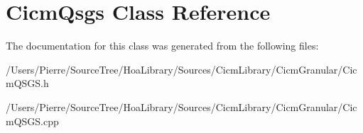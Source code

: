 \hypertarget{class_cicm_qsgs}{\section{Cicm\-Qsgs Class Reference}
\label{class_cicm_qsgs}
}


The documentation for this class was generated from the following files\-:\begin{DoxyCompactItemize}
\item 
/\-Users/\-Pierre/\-Source\-Tree/\-Hoa\-Library/\-Sources/\-Cicm\-Library/\-Cicm\-Granular/Cicm\-Q\-S\-G\-S.\-h\item 
/\-Users/\-Pierre/\-Source\-Tree/\-Hoa\-Library/\-Sources/\-Cicm\-Library/\-Cicm\-Granular/Cicm\-Q\-S\-G\-S.\-cpp\end{DoxyCompactItemize}
